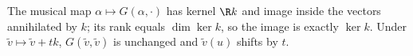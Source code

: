 The musical map $\alpha \mapsto G(\alpha, \cdot)$ has kernel $\R k$ and image inside the vectors annihilated by $k$; its rank equals $\dim\ker k$, so the image is exactly $\ker k$. Under $\tilde v \mapsto \tilde v + tk$, $G(\tilde v, \tilde v)$ is unchanged and $\tilde v(u)$ shifts by $t$.
